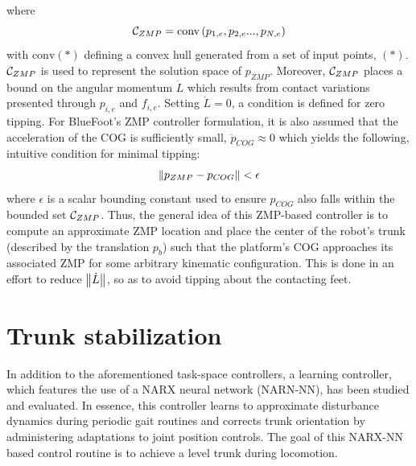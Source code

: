 		where
			\begin{equation}
				{\cal C}_{ZMP} = \text{conv}\left(p_{1,e},p_{2,e}...,p_{N,e}\right)
			\end{equation}
		with $\text{conv}(*)$ defining a convex hull generated from a set of input points, $(*)$. ${\cal C}_{ZMP}$ is used to represent the solution space of $p_{ZMP}$. Moreover, ${\cal C}_{ZMP}$ places a bound on the angular momentum $\dot{L}$ which results from contact variations presented through $p_{i,e}$ and $f_{i,e}$. Setting $\dot{L}=0$, a condition is defined for zero tipping. For BlueFoot's ZMP controller formulation, it is also assumed that the acceleration of the COG is sufficiently small, \IE $\ddot{p}_{COG}\approx0$ which yields the following, intuitive condition for minimal tipping:
			\begin{equation}
				\left\lVert p_{ZMP} - p_{COG}\right\rVert < \epsilon
			\end{equation}
		where $\epsilon$ is a scalar bounding constant used to ensure $p_{COG}$ also falls within the bounded set ${\cal C}_{ZMP}$. Thus, the general idea of this ZMP-based controller is to compute an approximate ZMP location and place the center of the robot's trunk (described by the translation $p_{b}$) such that the platform's COG approaches its associated ZMP for some arbitrary kinematic configuration. This is done in an effort to reduce $\left\lVert\dot{L}\right\rVert$, so as to avoid tipping about the contacting feet.







	\section{Trunk stabilization}

		In addition to the aforementioned task-space controllers, a learning controller, which features the use of a NARX neural network (NARN-NN), has been studied and evaluated. In essence, this controller learns to approximate disturbance dynamics during periodic gait routines and corrects trunk orientation by administering adaptations to joint position controls. The goal of this NARX-NN based control routine is to achieve a level trunk during locomotion.
		
